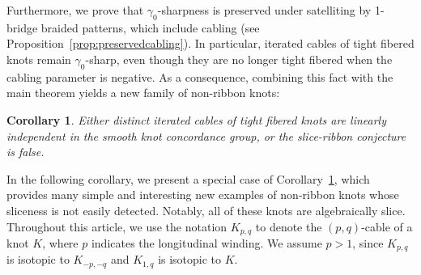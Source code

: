 \documentclass[11pt, reqno]{amsart}
\newtheorem{theorem}{Theorem}[section]
\newtheorem{corollary}[theorem]{Corollary}
\theoremstyle{definition}
\theoremstyle{remark}
\numberwithin{equation}{section}
\begin{document}



%

Furthermore, we prove that $\gamma_0$-sharpness is preserved under satelliting by 1-bridge braided patterns, which include cabling (see Proposition~\ref{prop:preservedcabling}). In particular, iterated cables of tight fibered knots remain $\gamma_0$-sharp, even though they are no longer tight fibered when the cabling parameter is negative. As a consequence, combining this fact with the main theorem yields a new family of non-ribbon knots:













\begin{corollary}\label{cor:main}
Either distinct iterated cables of tight fibered knots are linearly independent in the smooth knot concordance group, or the slice-ribbon conjecture is false.
\end{corollary}



In the following corollary, we present a special case of Corollary~\ref{cor:main}, which provides many simple and interesting new examples of non-ribbon knots whose sliceness is not easily detected.  
Notably, all of these knots are algebraically slice. Throughout this article, we use the notation $K_{p,q}$ to denote the $(p, q)$-cable of a knot $K$, where $p$ indicates the longitudinal winding. We assume $p > 1$, since $K_{p,q}$ is isotopic to $K_{-p,-q}$ and $K_{1,q}$ is isotopic to $K$.
\end{document}
